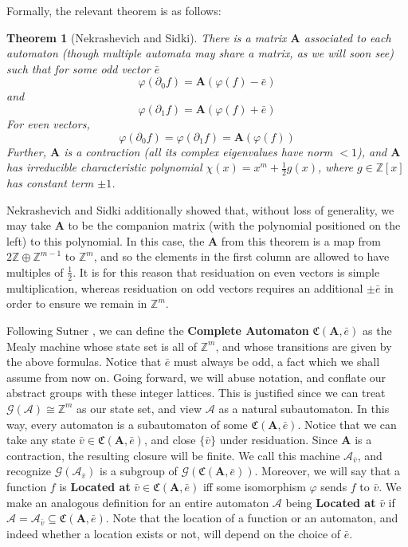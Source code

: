 \documentclass[12pt]{article}
\newcommand{\A}{\mathcal{A}}
\newcommand{\G}{\mathcal{G}}
\newcommand{\C}{\mathfrak{C}(\Am,\e)}
\newcommand{\Z}{\mathbb{Z}}
\newcommand{\2}{\textbf{2}}
\newcommand{\Am}{\textbf{A}}
\newcommand{\del}{\partial}
\renewcommand{\v}{\bar{v}}
\newcommand{\e}{\bar{e}}
\newtheorem{thm}{Theorem}
\begin{document}
Formally, the relevant theorem is as follows:
\begin{thm}[Nekrashevich and Sidki]
  There is a matrix $\Am$ associated to each automaton 
  (though multiple automata may share a matrix, as we will soon see)
  such that for some odd vector $\e$ 
  \[ \varphi (\del_0 f) = \Am (\varphi(f) - \e) \] and
  \[ \varphi (\del_1 f) = \Am (\varphi(f) + \e) \]
  For even vectors, 
  \[ \varphi (\del_0 f) = \varphi (\del_1 f) = \Am (\varphi(f)) \]
  Further, $\Am$ is a contraction (all its complex eigenvalues have norm $<1$),
  and $\Am$ has irreducible characteristic polynomial 
  $\chi(x) = x^m + \frac{1}{2}g(x)$, 
  where $g \in \Z[x]$ has constant term $\pm 1$.
\end{thm}

Nekrashevich and Sidki additionally showed that, without loss of generality, 
we may take $\Am$ to be the companion matrix 
(with the polynomial positioned on the left) 
to this polynomial. In this case, the $\Am$ from this theorem is a map from 
$2\Z \oplus \Z^{m-1}$ to $\Z^m$, and so the elements in the first column are
allowed to have multiples of $\frac{1}{2}$. It is for this reason that 
residuation on even vectors is simple multiplication, whereas residuation
on odd vectors requires an additional $\pm \e$ in order to ensure we
remain in $\Z^m$.

Following Sutner \cite{Sutner18:abelian_automata}, 
we can define the \textbf{Complete Automaton} 
$\C$ as the Mealy machine whose state set is all of
$\Z^m$, and whose transitions are given by the above formulas.
Notice that $\e$ must always be odd, a fact which we shall assume from now on.
Going forward, we will abuse notation, and conflate our abstract groups
with these integer lattices. This is justified since we can treat
$\G(\A) \cong \Z^m$ as our state set, and view $\A$ as a natural subautomaton. 
In this way, every automaton is a subautomaton of some $\C$.
Notice that we can take any state $\v \in \C$, 
and close $\{ \v \}$ under residuation.
Since $\Am$ is a contraction, the resulting closure will be finite.
We call this machine $\A_{\v}$, and recognize $\G(\A_{\v})$ is a subgroup of 
$\G(\C)$.
Moreover, we will say that a function $f$ is \textbf{Located at} 
$\v \in \C$ iff some isomorphism $\varphi$ sends 
$f$ to $\v$. We make an analogous definition for an entire automaton $\A$
being \textbf{Located at} $\v$ if 
$\A = \A_{\v} \subseteq \C$. Note that the location of a function or an
automaton, and indeed whether a location exists or not, 
will depend on the choice of $\e$.
\end{document}
